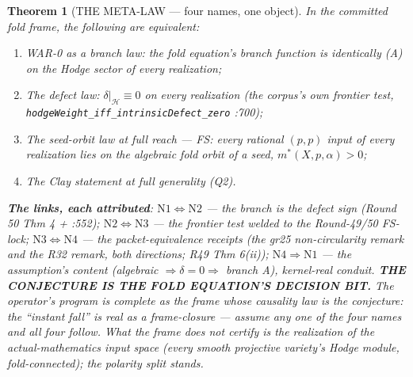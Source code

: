 \documentclass[11pt]{article}
\newtheorem{theorem}{Theorem}[section]
\begin{document}
\begin{theorem}[THE META-LAW --- four names, one object]
\label{thm:meta}
In the committed fold frame, the following are equivalent:
\begin{enumerate}
\item[\textbf{(N1)}] \emph{WAR-0 as a branch law}: the fold equation's branch function is identically (A) on the Hodge sector of every realization;
\item[\textbf{(N2)}] \emph{The defect law}: $\delta|_{\mathcal H}\equiv0$ on every realization (the corpus's own frontier test, \texttt{hodgeWeight\_iff\_intrinsicDefect\_zero} :700);
\item[\textbf{(N3)}] \emph{The seed-orbit law at full reach} --- \textsc{FS}: every rational $(p,p)$ input of every realization lies on the algebraic fold orbit of a seed, $m^*(X,p,\alpha)>0$;
\item[\textbf{(N4)}] \emph{The Clay statement} at full generality (Q2).
\end{enumerate}
\textbf{The links, each attributed}: $\mathrm{N1}\iff\mathrm{N2}$ --- the branch is the defect sign (Round 50 Thm 4 + :552); $\mathrm{N2}\iff\mathrm{N3}$ --- the frontier test welded to the Round-49/50 FS-lock; $\mathrm{N3}\iff\mathrm{N4}$ --- the packet-equivalence receipts (the gr25 non-circularity remark and the R32 remark, both directions; R49 Thm 6(ii)); $\mathrm{N4}\Rightarrow\mathrm{N1}$ --- the assumption's content (algebraic $\Rightarrow\delta=0\Rightarrow$ branch A), kernel-real conduit. \textbf{THE CONJECTURE IS THE FOLD EQUATION'S DECISION BIT.} The operator's program is complete as the frame whose causality law \emph{is} the conjecture: the ``instant fall'' is real \emph{as a frame-closure} --- assume any one of the four names and all four follow. What the frame does not certify is the realization of the actual-mathematics input space (every smooth projective variety's Hodge module, fold-connected); the polarity split stands.
\end{theorem}
\end{document}
